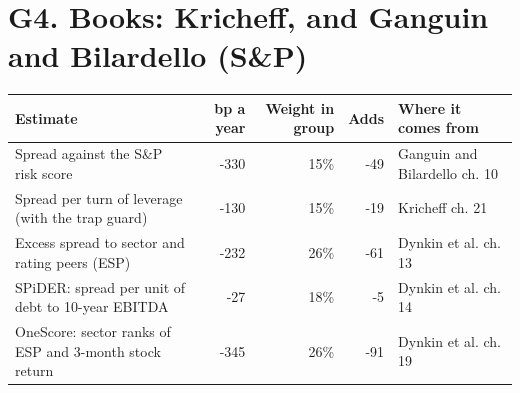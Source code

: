 \documentclass[11pt,a4paper]{article}
\begin{document}
\section*{G4. Books: Kricheff, and Ganguin and Bilardello (S\&P)}
\par\noindent{}
\begin{center}\footnotesize\setlength{\tabcolsep}{3.5pt}\begin{tabular}{@{}p{6.2cm}rrrp{4.2cm}@{}}\toprule
Estimate & bp a year & Weight in group & Adds & Where it comes from \\\midrule
Spread against the S\&P risk score & -330 & 15\% & -49 & Ganguin and Bilardello ch. 10 \\
Spread per turn of leverage (with the trap guard) & -130 & 15\% & -19 & Kricheff ch. 21 \\
Excess spread to sector and rating peers (ESP) & -232 & 26\% & -61 & Dynkin et al. ch. 13 \\
SPiDER: spread per unit of debt to 10-year EBITDA & -27 & 18\% & -5 & Dynkin et al. ch. 14 \\
OneScore: sector ranks of ESP and 3-month stock return & -345 & 26\% & -91 & Dynkin et al. ch. 19 \\
\bottomrule\end{tabular}\end{center}
\end{document}
